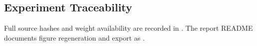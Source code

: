 \subsection{Experiment Traceability}

\begin{table}[H]
    \centering
    \caption{Archived experiment identities. All seeds are 42; best indices are zero-based. SHA-256 prefixes identify the saved configuration bytes; full hashes appear in the input manifest.}
    \label{tab:a1-run-traceability}
    \small
    \setlength{\tabcolsep}{4pt}
    
\end{table}

Full source hashes and weight availability are recorded in . The report README documents figure regeneration and export as .
